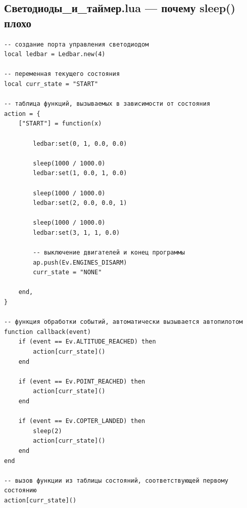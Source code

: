 \documentclass[a4paper,12pt]{article}
\begin{document}
\subsection{Светодиоды\_и\_таймер.lua — почему sleep() плохо}
\begin{lstlisting}[style=lua,caption={Светодиоды_и_таймер.lua}]
-- создание порта управления светодиодом
local ledbar = Ledbar.new(4)

-- переменная текущего состояния
local curr_state = "START"

-- таблица функций, вызываемых в зависимости от состояния
action = {
	["START"] = function(x)

		ledbar:set(0, 1, 0.0, 0.0)

		sleep(1000 / 1000.0) 
		ledbar:set(1, 0.0, 1, 0.0)

		sleep(1000 / 1000.0) 
		ledbar:set(2, 0.0, 0.0, 1)

		sleep(1000 / 1000.0) 
		ledbar:set(3, 1, 1, 0.0)

		-- выключение двигателей и конец программы
		ap.push(Ev.ENGINES_DISARM)
		curr_state = "NONE"

	end,
}

-- функция обработки событий, автоматически вызывается автопилотом
function callback(event)
	if (event == Ev.ALTITUDE_REACHED) then
		action[curr_state]()
	end

	if (event == Ev.POINT_REACHED) then
		action[curr_state]()
	end

	if (event == Ev.COPTER_LANDED) then
		sleep(2)
		action[curr_state]()
	end
end

-- вызов функции из таблицы состояний, соответствующей первому состоянию
action[curr_state]()
\end{lstlisting}
\end{document}
